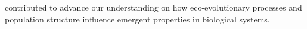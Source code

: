 \chapi contributed to advance our understanding on how eco-evolutionary processes and population structure influence emergent properties in biological systems.










































